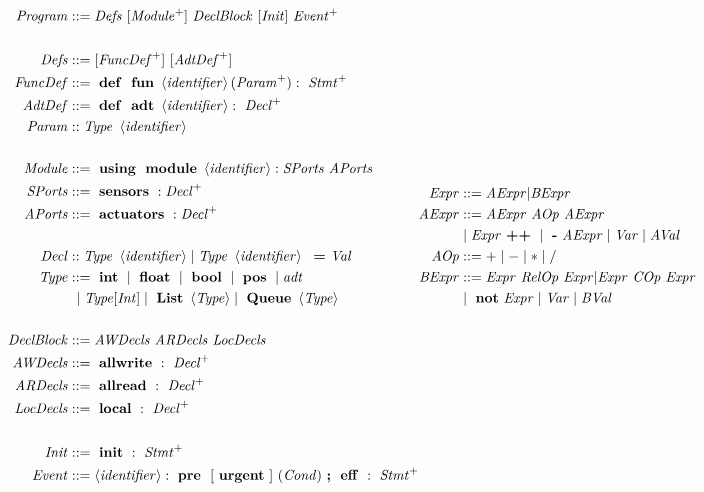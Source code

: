 \begin{figure}[H]
\scriptsize
\begin{align*}
\begin{split}
\pgm &::= \defs\ [\im]\ \db\ [\init]\ \evnts\  \\\\
\defs &::= [\fdefs^+]\ [\adefs^+]\\
\fdefs &::= \mterm{def}\mterm{fun} \id ( \params ):\ \stmts\\  
\adefs &::= \mterm{def}\mterm{adt} \id :\ \decls\\
\param &:: \type\ \id \\\\
\mathit{Module} &::= \mterm{using}\mterm{module}\id : \sports\ \aports\\
\sports &::= \mterm{sensors}:\decls \\ 
\aports &::= \mterm{actuators}:\decls\\\\
\decl &:: \type\ \id \mid \type\ \id \ \mterm{=} \val \\
\type &::= \mterm{int}\mid \mterm{float}\mid\mterm{bool}\mid \mterm{pos}\mid \mathit{adt} \\ &\ \mid \type [\mathit{Int}]\mid \mterm{List}\left\langle\type\right\rangle \mid \mterm{Queue}\left\langle\type\right\rangle\\\\
\db &::= \awd\ \ard\ \ld\\
\awd &::= \mterm{allwrite}:\ \decls\\ 
\ard &::= \mterm{allread}:\ \decls\\ 
\ld &::= \mterm{local}:\ \decls\\\\
\init &::= \mterm{init}:\ \stmts\\
\evnt &::= \id: \mterm{pre}\ [\mterm{urgent}]\ (\cnd)\mterm{;}\mterm{eff}:\ \stmts\\
\end{split}\begin{split}
\expr &::= \aexpr | \bexpr \\
\aexpr &::= \aexpr\ \mathit{AOp}\ \aexpr\\  
&\mid \expr \mterm{++} \mid \mterm{-} \aexpr \mid \var \mid \aval \\
\mathit{AOp} &::= +\mid-\mid*\mid / \\ 
\bexpr &::=  \expr\ \mathit{RelOp}\ \expr | \expr\ \mathit{COp}\ \expr\\
&\mid \mterm{not} \expr \mid \var\mid \bval\\

\end{split}
\end{align*}
\end{figure}
